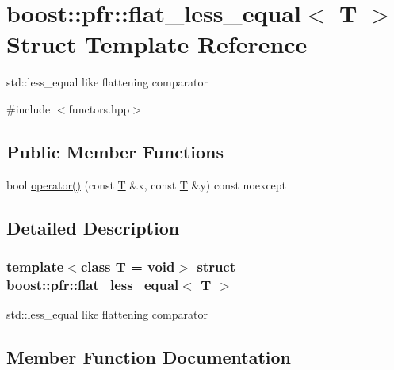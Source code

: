 \hypertarget{structboost_1_1pfr_1_1flat__less__equal}{}\section{boost\+:\+:pfr\+:\+:flat\+\_\+less\+\_\+equal$<$ T $>$ Struct Template Reference}
\label{structboost_1_1pfr_1_1flat__less__equal}


std\+::less\+\_\+equal like flattening comparator  




{\ttfamily \#include $<$functors.\+hpp$>$}

\subsection*{Public Member Functions}
\begin{DoxyCompactItemize}
\item 
bool \mbox{\hyperlink{structboost_1_1pfr_1_1flat__less__equal_a76971b1449cc180ee23cc1802551f0eb}{operator()}} (const \mbox{\hyperlink{struct_t}{T}} \&x, const \mbox{\hyperlink{struct_t}{T}} \&y) const noexcept
\end{DoxyCompactItemize}


\subsection{Detailed Description}
\subsubsection*{template$<$class T = void$>$\newline
struct boost\+::pfr\+::flat\+\_\+less\+\_\+equal$<$ T $>$}

std\+::less\+\_\+equal like flattening comparator 

\subsection{Member Function Documentation}
\mbox{\label{structboost_1_1pfr_1_1flat__less__equal_a76971b1449cc180ee23cc1802551f0eb}} 
